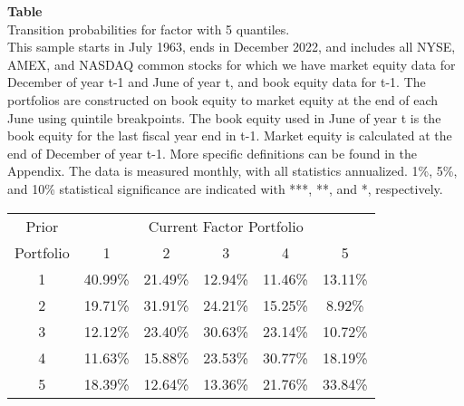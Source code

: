 \begin{table*}[ht!]
\raggedright
{}
\label{tab: transition_probs_AT_GR1_with_5_quantiles}
\textbf{Table \thetable} \\
Transition probabilities for factor with 5 quantiles. \\
\hspace*{1em}This sample starts in July 1963, ends in December 2022, and includes all NYSE, AMEX, and NASDAQ common stocks for which we have market equity data for December of year t-1 and June of year t, and book equity data for t-1. The portfolios are constructed on book equity to market equity at the end of each June using quintile breakpoints.  The book equity used in June of year t is the book equity for the last fiscal year end in t-1.  Market equity is calculated at the end of December of year t-1.  More specific definitions can be found in the Appendix.  The data is measured monthly, with all statistics annualized.  1\%, 5\%, and 10\% statistical significance are indicated with ***, **, and *, respectively. \\
\vspace{0.5em}
\centering
\begin{adjustbox}{max width=\textwidth}
\begin{tabular}{@{}cccccc@{}}
\toprule
Prior & \multicolumn{5}{c}{Current Factor Portfolio} \\
Portfolio & 1 & 2 & 3 & 4 & 5 \\
\midrule
1 & 40.99\% & 21.49\% & 12.94\% & 11.46\% & 13.11\% \\
2 & 19.71\% & 31.91\% & 24.21\% & 15.25\% & 8.92\% \\
3 & 12.12\% & 23.40\% & 30.63\% & 23.14\% & 10.72\% \\
4 & 11.63\% & 15.88\% & 23.53\% & 30.77\% & 18.19\% \\
5 & 18.39\% & 12.64\% & 13.36\% & 21.76\% & 33.84\% \\
\bottomrule
\end{tabular}
\end{adjustbox}
\end{table*}